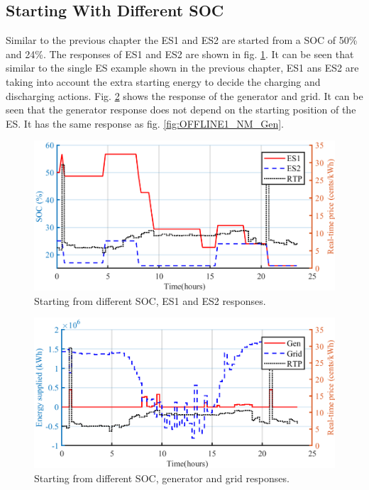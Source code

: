 \subsection{Starting With Different SOC}
Similar to the previous chapter the ES1 and ES2 are started from a SOC of 50\% and 24\%. The responses of ES1 and ES2 are shown in  fig. \ref{fig:OFF_DIFF_SOC_ES12}. It can be seen that similar to the single ES example shown in the previous chapter, ES1 ans ES2 are taking into account the extra starting energy to decide the charging and discharging actions. Fig. \ref{fig:OFF_DIFF_SOC_GRID_GEN} shows the response of the generator and grid. It can be seen that the generator response does not depend on the starting position of the ES. It has the same response as fig. \ref{fig:OFFLINE1_NM_Gen}.

\begin{figure}[!ht]
\centering
\includegraphics[width = \linewidth]{figs/A82/OFF_DIFF_SOC_ES12.png}
\caption{Starting from different SOC, ES1 and ES2 responses.}
\label{fig:OFF_DIFF_SOC_ES12}
\end{figure}

\begin{figure}[!ht]
\centering
\includegraphics[width = \linewidth]{figs/A82/OFF_DIFF_SOC_GRID_GEN.png}
\caption{Starting from different SOC, generator and grid responses.}
\label{fig:OFF_DIFF_SOC_GRID_GEN}
\end{figure}
